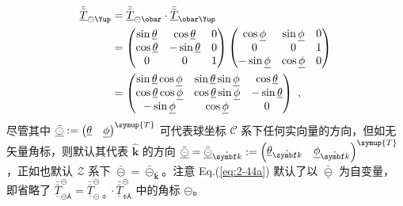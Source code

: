\begin{subequations} \label{eq:2-44}
	\abovedisplayskip=0pt
	\belowdisplayskip=10pt
	\begin{align}
		\bar{\bar{\underline{T}}}_{\circleddash\Yup} &= \bar{\bar{\underline{T}}}_{\circleddash\obar} \cdot \bar{\bar{\underline{T}}}_{\obar\Yup} \label{eq:2-44a}\\ &= \begin{pmatrix} \sin{\underline{\theta}} & \cos{\underline{\theta}} & 0 \\ \cos{\underline{\theta}} & -\sin{\underline{\theta}} & 0 \\ 0 & 0 & 1 \end{pmatrix} \begin{pmatrix} \cos{\underline{\phi}} & \sin{\underline{\phi}} & 0 \\ 0 & 0 & 1 \\ -\sin{\underline{\phi}} & \cos{\underline{\phi}} & 0 \end{pmatrix} \label{eq:2-44b} \\ &= \begin{pmatrix} \sin{\underline{\theta}}\cos{\underline{\phi}} & \sin{\underline{\theta}}\sin{\underline{\phi}} & \cos{\underline{\theta}} \\ \cos{\underline{\theta}}\cos{\underline{\phi}} & \cos{\underline{\theta}}\sin{\underline{\phi}} & -\sin{\underline{\theta}} \\ -\sin{\underline{\phi}} & \cos{\underline{\phi}} & 0 \end{pmatrix} \label{eq:2-44c}~,
	\end{align}
\end{subequations}
尽管其中 $\bar{\underline{\circleddash}} := \begin{pmatrix} \underline{\theta} & \underline{\phi} \end{pmatrix}^{\symup{T}}$ 可代表球坐标 $\mathcal{C}$ 系下任何实向量的方向，但如无矢量角标，则默认其代表 $\hat{\symbf k}$ 的方向 $\bar{\underline{\circleddash}} = \bar{\underline{\circleddash}}_{\hat{\symbf k}} := \begin{pmatrix} \underline{\theta}_{\hat{\symbf k}} & \underline{\phi}_{\hat{\symbf k}} \end{pmatrix}^{\symup{T}}$，正如也默认 $\mathcal{Z}$ 系下 $\bar{\circleddash} = \bar{\circleddash}_{\hat{\symbf k}}$。注意 Eq.(\ref{eq:2-44a}) 默认了以 $\bar{\underline{\circleddash}}$ 为自变量，即省略了 $\bar{\bar{\underline{T}}}^{\circleddash}_{\circleddash\Yup} = \bar{\bar{\underline{T}}}^{\circleddash}_{\circleddash\obar} \cdot \bar{\bar{\underline{T}}}^{\circleddash}_{\obar\Yup}$ 中的角标 $\circleddash$。

